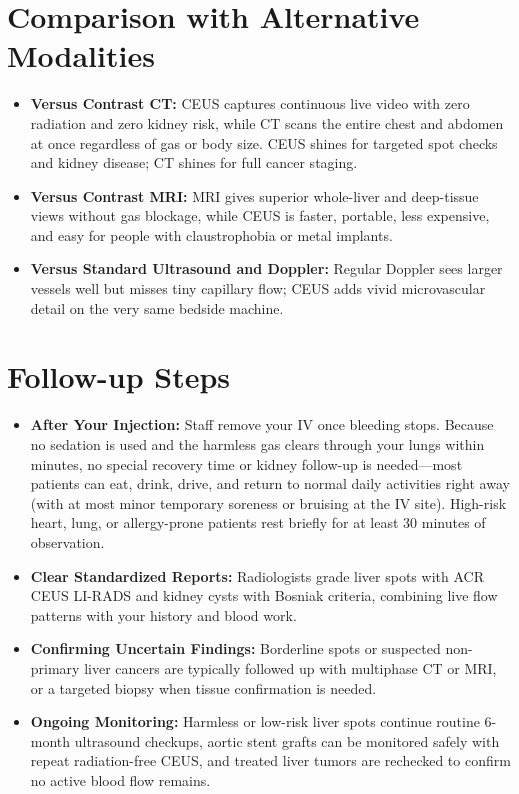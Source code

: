 \section{Comparison with Alternative Modalities}

\begin{itemize}
    \item \textbf{Versus Contrast CT:} CEUS captures continuous live video with zero radiation and zero kidney risk, while CT scans the entire chest and abdomen at once regardless of gas or body size. CEUS shines for targeted spot checks and kidney disease; CT shines for full cancer staging.
    \item \textbf{Versus Contrast MRI:} MRI gives superior whole-liver and deep-tissue views without gas blockage, while CEUS is faster, portable, less expensive, and easy for people with claustrophobia or metal implants.
    \item \textbf{Versus Standard Ultrasound and Doppler:} Regular Doppler sees larger vessels well but misses tiny capillary flow; CEUS adds vivid microvascular detail on the very same bedside machine.
\end{itemize}

\section{Follow-up Steps}

\begin{itemize}
    \item \textbf{After Your Injection:} Staff remove your IV once bleeding stops. Because no sedation is used and the harmless gas clears through your lungs within minutes, no special recovery time or kidney follow-up is needed---most patients can eat, drink, drive, and return to normal daily activities right away (with at most minor temporary soreness or bruising at the IV site). High-risk heart, lung, or allergy-prone patients rest briefly for at least 30 minutes of observation.
    \item \textbf{Clear Standardized Reports:} Radiologists grade liver spots with ACR CEUS LI-RADS and kidney cysts with Bosniak criteria, combining live flow patterns with your history and blood work.
    \item \textbf{Confirming Uncertain Findings:} Borderline spots or suspected non-primary liver cancers are typically followed up with multiphase CT or MRI, or a targeted biopsy when tissue confirmation is needed.
    \item \textbf{Ongoing Monitoring:} Harmless or low-risk liver spots continue routine 6-month ultrasound checkups, aortic stent grafts can be monitored safely with repeat radiation-free CEUS, and treated liver tumors are rechecked to confirm no active blood flow remains.
\end{itemize}

